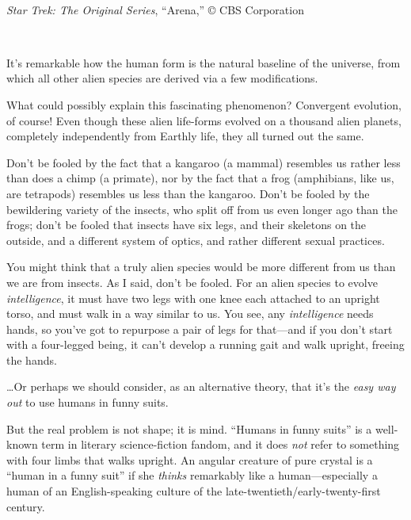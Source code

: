 {
 ~}

{\centering
{}
 \newline
 \textit{Star Trek: The Original Series},
``Arena,'' © CBS Corporation
\par}


\bigskip

{
 ~}

{
 It's remarkable how the human form is the natural
baseline of the universe, from which all other alien species are
derived via a few modifications.}

{
 What could possibly explain this fascinating phenomenon?
Convergent evolution, of course! Even though these alien life-forms
evolved on a thousand alien planets, completely independently from
Earthly life, they all turned out the same.}

{
 Don't be fooled by the fact that a kangaroo (a
mammal) resembles us rather less than does a chimp (a primate), nor by
the fact that a frog (amphibians, like us, are tetrapods) resembles us
less than the kangaroo. Don't be fooled by the
bewildering variety of the insects, who split off from us even longer
ago than the frogs; don't be fooled that insects have
six legs, and their skeletons on the outside, and a different system of
optics, and rather different sexual practices.}

{
 You might think that a truly alien species would be more different
from us than we are from insects. As I said, don't be
fooled. For an alien species to evolve \textit{intelligence}, it must
have two legs with one knee each attached to an upright torso, and must
walk in a way similar to us. You see, any \textit{intelligence} needs
hands, so you've got to repurpose a pair of legs for
that---and if you don't start with a four-legged being,
it can't develop a running gait and walk upright,
freeing the hands.}

{
 \ldots Or perhaps we should consider, as an alternative theory,
that it's the \textit{easy way out} to use humans in
funny suits.}

{
 But the real problem is not shape; it is mind.
``Humans in funny suits'' is a
well-known term in literary science-fiction fandom, and it does
\textit{not} refer to something with four limbs that walks upright. An
angular creature of pure crystal is a ``human in a
funny suit'' if she \textit{thinks} remarkably like a
human---especially a human of an English-speaking culture of the
late-twentieth/early-twenty-first century.}

